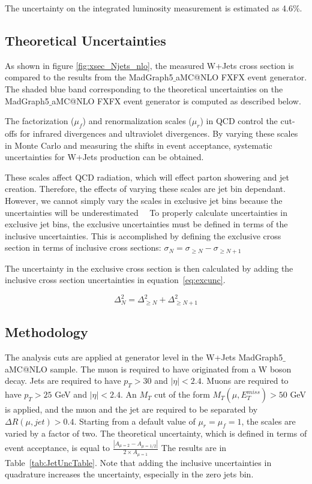 \documentclass[oneside, letterpaper, oldfontcommands]{memoir}
\begin{document}
\qquad The uncertainty on the integrated luminosity measurement is estimated as 4.6\%.

\subsection{Theoretical Uncertainties}
\qquad As shown in figure \ref{fig:xsec_Njets_nlo}, the measured W+Jets cross section is compared to the results from the {\sc MadGraph5$\_$aMC@NLO} FXFX event generator. The shaded blue band corresponding to the theoretical uncertainties on the {\sc MadGraph5$\_$aMC@NLO} FXFX event generator is computed as described below.

\qquad The factorization ($\mu_{f}$) and renormalization scales ($\mu_{r}$) in QCD control the cut-offs for infrared divergences and ultraviolet divergences. By varying these scales in Monte Carlo and measuring the shifts in event acceptance, systematic uncertainties for W+Jets production can be obtained.

\qquad These scales affect QCD radiation, which will effect parton showering and jet creation. Therefore, the effects of varying these scales are jet bin dependant. However, we cannot simply vary the scales in exclusive jet bins because the uncertainties will be underestimated~\cite{Gangal:2013nxa}~\cite{Stewart:2011cf} To properly calculate uncertainties in exclusive jet bins, the exclusive uncertainties must be defined in terms of the inclusive uncertainties.
This is accomplished by defining the exclusive cross section in terms of inclusive cross sections: $\sigma_{N} = \sigma_{\geq N} - \sigma_{\geq N+1}$

\qquad The uncertainty in the exclusive cross section is then calculated by adding the inclusive cross section uncertainties in equation~\eqref{eq:excunc}.

\begin{equation}
\label{eq:excunc}
\Delta_{N}^2 = \Delta_{\geq N}^2 + \Delta_{\geq N+1}^2
\end{equation}

\subsection{Methodology}
\label{application}

\qquad The analysis cuts are applied at generator level in the W+Jets {\sc MadGraph5$\_$aMC@NLO} sample. The muon is required to have originated from a W boson decay. Jets are required to have $p_{T} > 30$ and $|\eta| < 2.4$. Muons are required to have $p_{T} > 25$ GeV and $|\eta| < 2.4$. An $M_{T}$ cut of the form $M_{T}(\mu,E_{T}^{miss}) > 50$ GeV is applied, and the muon and the jet are required to be separated by $\Delta R(\mu,jet) > 0.4$. Starting from a default value of $\mu_{r} = \mu_{f} = 1$, the scales are varied by a factor of two. The theoretical uncertainty, which is defined in terms of event acceptance, is equal to $\frac{|A_{\mu=2} - A_{\mu=1/2}|}{2 \times A_{\mu=1}}$  The results are in Table~\ref{tab:JetUncTable}. Note that adding the inclusive uncertainties in quadrature increases the uncertainty, especially in the zero jets bin.
\end{document}
